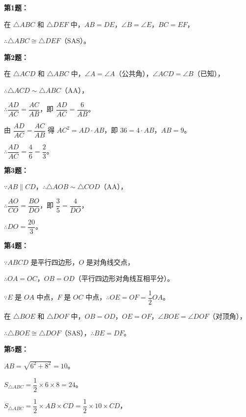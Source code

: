 \documentclass[12pt, a4paper]{ctexart}
\begin{document}
\vspace{10pt}

\begin{knowledgebox}[参考答案]

\textbf{第1题：}

在 $\triangle ABC$ 和 $\triangle DEF$ 中，$AB=DE$，$\angle B=\angle E$，$BC=EF$，

$\therefore \triangle ABC \cong \triangle DEF$（SAS）。

\medskip
\textbf{第2题：}

在 $\triangle ACD$ 和 $\triangle ABC$ 中，$\angle A=\angle A$（公共角），$\angle ACD=\angle B$（已知），

$\therefore \triangle ACD \sim \triangle ABC$（AA），

$\therefore \dfrac{AD}{AC}=\dfrac{AC}{AB}$，即 $\dfrac{AD}{AC}=\dfrac{6}{AB}$。

由 $\dfrac{AD}{AC}=\dfrac{AC}{AB}$ 得 $AC^2=AD\cdot AB$，即 $36=4\cdot AB$，$AB=9$。

$\therefore \dfrac{AD}{AC}=\dfrac{4}{6}=\dfrac{2}{3}$。

\medskip
\textbf{第3题：}

$\because AB \parallel CD$，$\therefore \triangle AOB \sim \triangle COD$（AA），

$\therefore \dfrac{AO}{CO}=\dfrac{BO}{DO}$，即 $\dfrac{3}{5}=\dfrac{4}{DO}$，

$\therefore DO=\dfrac{20}{3}$。

\medskip
\textbf{第4题：}

$\because ABCD$ 是平行四边形，$O$ 是对角线交点，

$\therefore OA=OC$，$OB=OD$（平行四边形对角线互相平分）。

$\because E$ 是 $OA$ 中点，$F$ 是 $OC$ 中点，$\therefore OE=OF=\dfrac{1}{2}OA$。

在 $\triangle BOE$ 和 $\triangle DOF$ 中，$OB=OD$，$OE=OF$，$\angle BOE=\angle DOF$（对顶角），

$\therefore \triangle BOE \cong \triangle DOF$（SAS），$\therefore BE=DF$。

\medskip
\textbf{第5题：}

$AB=\sqrt{6^2+8^2}=10$。

$S_{\triangle ABC}=\dfrac{1}{2}\times 6\times 8=24$。

$S_{\triangle ABC}=\dfrac{1}{2}\times AB\times CD=\dfrac{1}{2}\times 10\times CD$，


\end{knowledgebox}
\end{document}
